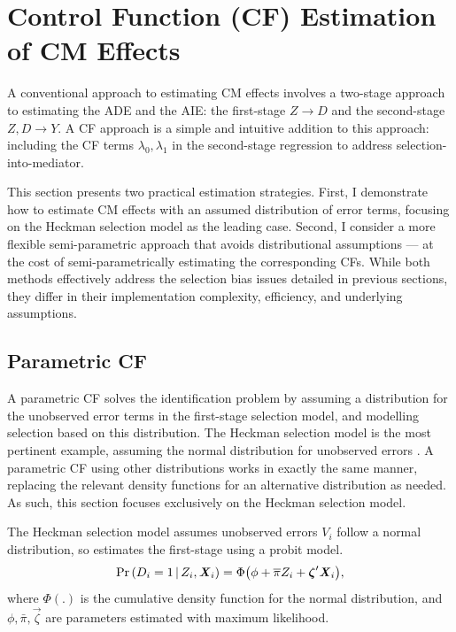 \section{Control Function (CF) Estimation of CM Effects}
\label{sec:controlfun}
A conventional approach to estimating CM effects involves a two-stage approach to estimating the ADE and the AIE: the first-stage $Z \to D$ and the second-stage $Z, D \to Y$.
A CF approach is a simple and intuitive addition to this approach: including the CF terms $\lambda_0, \lambda_1$ in the second-stage regression to address selection-into-mediator.

This section presents two practical estimation strategies.
First, I demonstrate how to estimate CM effects with an assumed distribution of error terms, focusing on the Heckman selection model as the leading case.
Second, I consider a more flexible semi-parametric approach that avoids distributional assumptions --- at the cost of semi-parametrically estimating the corresponding CFs.
While both methods effectively address the selection bias issues detailed in previous sections, they differ in their implementation complexity, efficiency, and underlying assumptions.

\subsection{Parametric CF}
A parametric CF solves the identification problem by assuming a distribution for the unobserved error terms in the first-stage selection model, and modelling selection based on this distribution.
The Heckman selection model is the most pertinent example, assuming the normal distribution for unobserved errors \citep{heckman1979sample}.
A parametric CF using other distributions works in exactly the same manner, replacing the relevant density functions for an alternative distribution as needed.
As such, this section focuses exclusively on the Heckman selection model.

The Heckman selection model assumes unobserved errors $V_i$ follow a normal distribution, so estimates the first-stage using a probit model.
\[ \Pr\left( D_i = 1 \, \middle\vert \, Z_i, \boldsymbol{\mathit{X}}_i \right)
    = \Phi \big( \phi + \overline{\pi} Z_i + \boldsymbol{\mathit{\zeta}}' \boldsymbol{\mathit{X}}_i \big), \]
where $\Phi(.)$ is the cumulative density function for the normal distribution, and $\phi, \bar\pi, \vec\zeta$ are parameters estimated with maximum likelihood.

